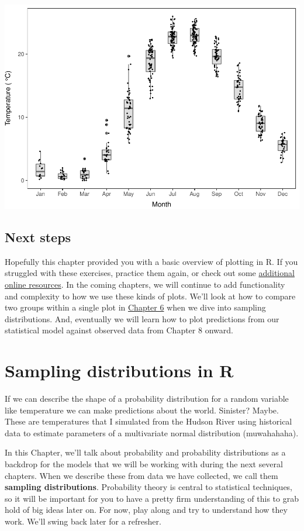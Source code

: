 \documentclass[
]{book}
\begin{document}
\includegraphics{worstr_files/figure-latex/unnamed-chunk-114-1.pdf}

\hypertarget{next4}{%
\section{Next steps}\label{next4}}

Hopefully this chapter provided you with a basic overview of plotting in R. If you struggled with these exercises, practice them again, or check out some \href{https://danstich.github.io/stich/classes/BIOL217/resources.html}{additional online resources}. In the coming chapters, we will continue to add functionality and complexity to how we use these kinds of plots. We'll look at how to compare two groups within a single plot in \protect\hyperlink{Chapter6}{Chapter 6} when we dive into sampling distributions. And, eventually we will learn how to plot predictions from our statistical model against observed data from Chapter 8 onward.

\hypertarget{Chapter5}{%
\chapter{Sampling distributions in R}\label{Chapter5}}

If we can describe the shape of a probability distribution for a random variable like temperature we can make predictions about the world. Sinister? Maybe. These are temperatures that I simulated from the Hudson River using historical data to estimate parameters of a multivariate normal distribution (muwahahaha).

In this Chapter, we'll talk about probability and probability distributions as a backdrop for the models that we will be working with during the next several chapters. When we describe these from data we have collected, we call them \textbf{sampling distributions}. Probability theory is central to statistical techniques, so it will be important for you to have a pretty firm understanding of this to grab hold of big ideas later on. For now, play along and try to understand how they work. We'll swing back later for a refresher.
\end{document}
